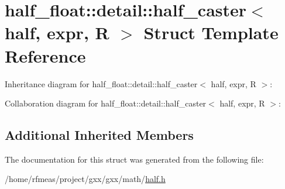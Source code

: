 \hypertarget{structhalf__float_1_1detail_1_1half__caster_3_01half_00_01expr_00_01R_01_4}{}\section{half\+\_\+float\+:\+:detail\+:\+:half\+\_\+caster$<$ half, expr, R $>$ Struct Template Reference}
\label{structhalf__float_1_1detail_1_1half__caster_3_01half_00_01expr_00_01R_01_4}


Inheritance diagram for half\+\_\+float\+:\+:detail\+:\+:half\+\_\+caster$<$ half, expr, R $>$\+:


Collaboration diagram for half\+\_\+float\+:\+:detail\+:\+:half\+\_\+caster$<$ half, expr, R $>$\+:
\subsection*{Additional Inherited Members}


The documentation for this struct was generated from the following file\+:\begin{DoxyCompactItemize}
\item 
/home/rfmeas/project/gxx/gxx/math/\hyperlink{half_8h}{half.\+h}\end{DoxyCompactItemize}
